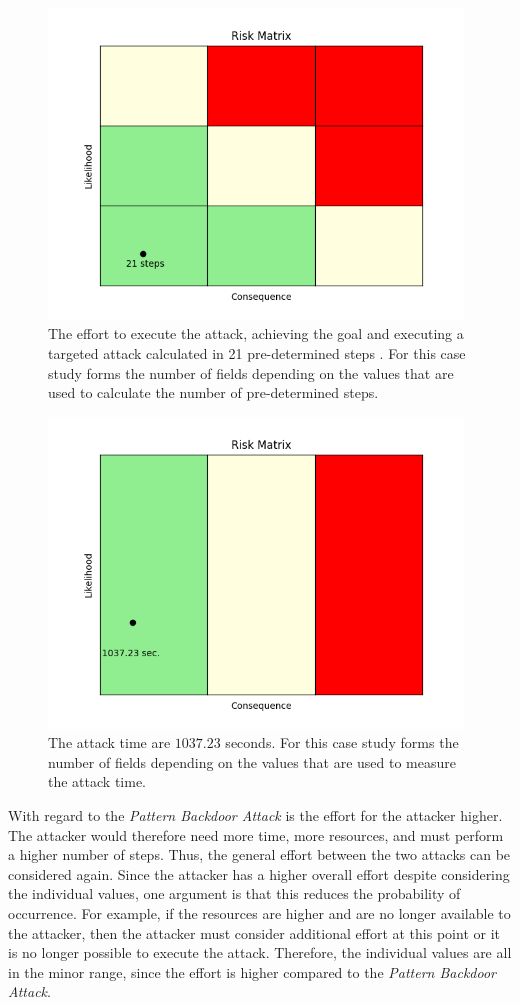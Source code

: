 \begin{figure}[ht!]
  \centering
  \includegraphics[width=11cm]{pictures/attack_steps.png}
  \caption{The effort to execute the attack, achieving the goal and executing a targeted attack calculated in 21 pre-determined steps \cite{bsi_2013}. For this case
  study forms the number of fields depending on the values that are used to calculate the number of pre-determined steps.}
  \label{fig:attack_steps}
\end{figure}

\begin{figure}[ht!]
  \centering
  \includegraphics[width=11cm]{pictures/attack_time.png}
  \caption{The attack time are $1037.23$ seconds. For this case
  study forms the number of fields depending on the values that are used to measure the attack time.}
  \label{fig:attack_time}
\end{figure}

With regard to the \textit{Pattern Backdoor Attack} is the effort for the attacker higher. The attacker would therefore need more time, more resources, and must perform a higher number of steps. Thus, the general effort between the two attacks can be considered again. Since the attacker has a higher overall effort despite considering the individual values, one argument is that this reduces the probability of occurrence. For example, if the resources are higher and are no longer available to the attacker, then the attacker must consider additional effort at this point or it is no longer possible to execute the attack. Therefore, the individual values are all in the minor range, since the effort is higher compared to the \textit{Pattern Backdoor Attack}.

